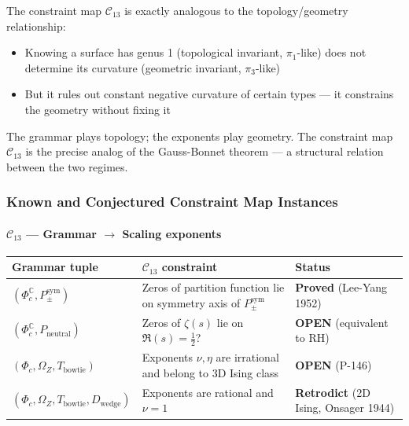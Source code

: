 \documentclass[12pt,a4paper]{article}
\begin{document}
The constraint map $\mathcal{C}_{13}$ is exactly analogous to the topology/geometry relationship:

\begin{itemize}
    \item Knowing a surface has genus 1 (topological invariant, $\pi_1$-like) does not determine its curvature (geometric invariant, $\pi_3$-like)
    \item But it rules out constant negative curvature of certain types --- it constrains the geometry without fixing it
\end{itemize}

The grammar plays topology; the exponents play geometry. The constraint map $\mathcal{C}_{13}$ is the precise analog of the Gauss-Bonnet theorem --- a structural relation between the two regimes.

\subsubsection{Known and Conjectured Constraint Map Instances}

\paragraph{$\mathcal{C}_{13}$ --- Grammar $\rightarrow$ Scaling exponents}

\begin{table}[htbp]
\centering
\small
{}
\begin{tabularx}{\textwidth}{>{\centering\arraybackslash}X >{\centering\arraybackslash}X >{\centering\arraybackslash}X}
\toprule
\rowcolor{gray!25}\textbf{Grammar tuple} & \textbf{$\mathcal{C}_{13}$ constraint} & \textbf{Status} \\
\midrule
\rowcolors{1}{white}{gray!10}
$(\Phi_c^{\mathbb{C}}, P_{\pm}^{\text{sym}})$ & Zeros of partition function lie on symmetry axis of $P_{\pm}^{\text{sym}}$ &  \textbf{Proved} (Lee-Yang 1952) \\
$(\Phi_c^{\mathbb{C}}, P_\text{neutral})$ & Zeros of $\zeta(s)$ lie on $\Re(s) = \frac{1}{2}$? & \textbf{OPEN} (equivalent to RH) \\
$(\Phi_c, \Omega_Z, T_\text{bowtie})$ & Exponents $\nu, \eta$ are irrational and belong to 3D Ising class & \textbf{OPEN} (P-146) \\
$(\Phi_c, \Omega_Z, T_\text{bowtie}, D_\text{wedge})$ & Exponents are rational and $\nu = 1$ & \textbf{Retrodict} (2D Ising, Onsager 1944) \\
\bottomrule
\end{tabularx}
\end{table}
\end{document}
